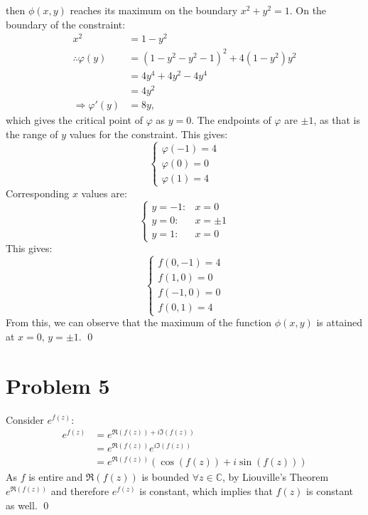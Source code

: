 \documentclass[a4paper, titlepage, DIV=14]{scrartcl}
\begin{document}
      then $\phi(x,y)$ reaches its maximum on the boundary $x^{2}+y^{2}=1$. On the boundary of the constraint:
      \begin{align*}
        x^{2} &= 1 - y^{2} \\
        \therefore \varphi(y) &= (1-y^{2}-y^{2}-1)^{2} + 4(1-y^{2})y^{2} \\
        &= 4y^{4}+4y^{2}-4y^{4} \\
        &= 4y^{2} \\
        \Rightarrow \varphi'(y) &= 8y,
      \end{align*}
      which gives the critical point of $\varphi$ as $y=0$. The endpoints of $\varphi$ are $\pm 1$, as that is the range of $y$ values for the 
      constraint. This gives:
      \[
        \begin{cases}
          \varphi(-1) = 4 \\
          \varphi(0) = 0 \\
          \varphi(1) = 4 
        \end{cases}
      \]
      Corresponding $x$ values are:
      \[
        \begin{cases}
          y = -1 : & x = 0 \\
          y = 0 : & x = \pm 1 \\
          y = 1 : & x = 0
        \end{cases}
      \]
      This gives:
      \[
        \begin{cases}
          f(0,-1) = 4 \\
          f(1,0) = 0 \\
          f(-1,0) = 0 \\
          f(0,1) = 4 
        \end{cases}  
      \]
      From this, we can observe that the maximum of the function $\phi(x,y)$ is attained at $x=0, \, y=\pm 1$. \qed
   
    \section*{Problem 5}
    Consider $e^{f(z)}$:
    \begin{align*}
      e^{f(z)} &= e^{\Re(f(z)) + i\Im(f(z))} \\
        &= e^{\Re(f(z))}e^{i\Im(f(z))} \\
        &= e^{\Re(f(z))}(\cos(f(z)) + i\sin(f(z)))
    \end{align*}
    As $f$ is entire and $\Re(f(z))$ is bounded $\forall z \in \mathbb{C}$, by Liouville's Theorem 
    $e^{\Re(f(z))}$ and therefore $e^{f(z)}$ is constant, which implies that $f(z)$ is constant as well. \qed
    
\end{document}
